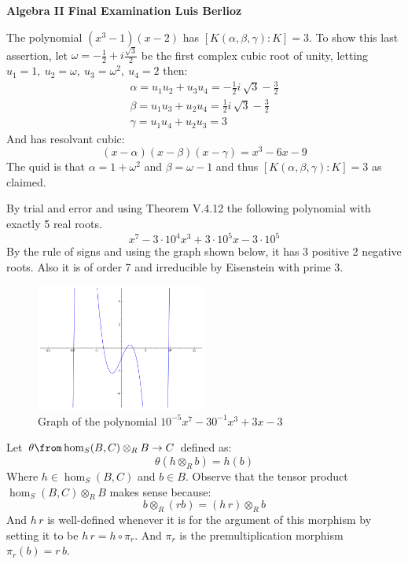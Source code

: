 \noindent\textbf{Algebra II Final Examination \hspace{\fill} Luis Berlioz}

The polynomial $(x^3-1)(x-2)$ has $[K(\alpha,\beta,\gamma):K]=3$. To show this last assertion, let $\omega= -\frac 12 +i\frac{\sqrt 3}{2}$ be the first complex cubic root of unity, letting $u_1=1,\ u_2=\omega,\ u_3=\omega^2,\ u_4=2$ then:
\begin{gather*}
    \alpha = u_1u_2 + u_3u_4 = -\frac{1}{2} i \, \sqrt{3} - \frac{3}{2}\\
    \beta = u_1u_3 + u_2u_4 = \frac{1}{2} i \, \sqrt{3} - \frac{3}{2}\\
    \gamma = u_1u_4 + u_2u_3 =3
\end{gather*}
And has resolvant cubic:
$$(x-\alpha)(x-\beta)(x-\gamma)= x^3 - 6x - 9$$
The quid is that $\alpha=1+\omega^2$ and $\beta=\omega-1$ and thus $[K(\alpha,\beta,\gamma):K]=3$ as claimed. 

By trial and error and using Theorem V.4.12 the following polynomial with exactly 5 real roots. 
$$x^7-3\cdot10^{4}x^3 + 3\cdot 10^5x- 3\cdot 10^5$$
By the rule of signs and using the graph shown below, it has 3 positive 2 negative roots. Also it is of order 7 and irreducible by Eisenstein with prime 3.
    \begin{figure}[h]
\begin{center}
\includegraphics[width=0.5\textwidth]{sage0.png}
\caption{Graph of the polynomial $10^{-5}x^7-30^{-1}x^3 + 3x- 3$}
\end{center}
\end{figure}

Let $\theta \from \hom_S(B,C)\otimes_R B \to C$ defined as:
$$\theta (h\otimes_R b)= h(b)$$
Where $h\in \hom_S(B,C)$ and $b\in B$. Observe that the tensor product  $\hom_S(B,C) \otimes_R B$ makes sense because:
$$b \otimes_R(rb) = (h\, r) \otimes_ R b$$
And $h\,r$ is well-defined whenever it is for the argument of this morphism by setting it to be $h\, r =h \circ \pi_r$. And $\pi_r$ is the premultiplication morphism $\pi_r(b)=r\, b$.

